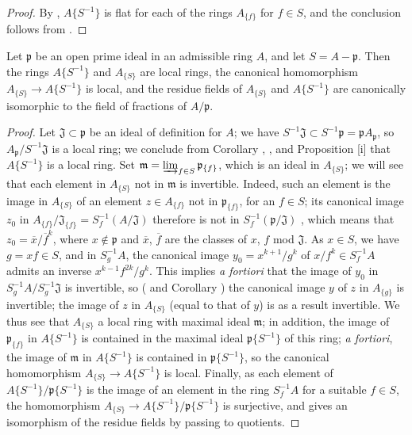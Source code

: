 \begin{proof}
By , $A\{S^{-1}\}$ is flat for each of the rings $A_{\{f\}}$ for
$f\in S$, and the conclusion follows from .
\end{proof}

\begin{proposition}[7.6.17]
\label{0.7.6.17}
Let $\mathfrak{p}$ be an open prime ideal in an admissible ring $A$, and let $S=A-\mathfrak{p}$.
Then the rings $A\{S^{-1}\}$ and $A_{\{S\}}$ are local rings, the canonical homomorphism
$A_{\{S\}}\to A\{S^{-1}\}$ is local, and the residue fields of $A_{\{S\}}$ and $A\{S^{-1}\}$ are
canonically isomorphic to the field of fractions of $A/\mathfrak{p}$.
\end{proposition}

\begin{proof}
Let $\mathfrak{J}\subset\mathfrak{p}$ be an ideal of definition for $A$; we have
$S^{-1}\mathfrak{J}\subset S^{-1}\mathfrak{p}=\mathfrak{p}A_\mathfrak{p}$, so
$A_\mathfrak{p}/S^{-1}\mathfrak{J}$ is a local ring; we conclude from 
Corollary , , and
Proposition [i] that $A\{S^{-1}\}$ is a local ring. Set
$\mathfrak{m}=\varinjlim_{f\in S}\mathfrak{p}_{\{f\}}$, which is an ideal in $A_{\{S\}}$; we
will see that each element in $A_{\{S\}}$ not in $\mathfrak{m}$ is invertible. Indeed, such an
element is the image in $A_{\{S\}}$ of an element $z\in A_{\{f\}}$ not in $\mathfrak{p}_{\{f\}}$,
for an $f\in S$; its canonical image $z_0$ in
$A_{\{f\}}/\mathfrak{J}_{\{f\}}=S_f^{-1}(A/\mathfrak{J})$ therefore is not in
$S_f^{-1}(\mathfrak{p}/\mathfrak{J})$ , which means that
$z_0=\overline{x}/\overline{f}^k$, where $x\not\in\mathfrak{p}$ and $\overline{x}$, $\overline{f}$
are the classes of $x$, $f$ mod $\mathfrak{J}$. As $x\in S$, we have $g=xf\in S$, and in
$S_g^{-1}A$, the canonical image $y_0=x^{k+1}/g^k$ of $x/f^k\in S_f^{-1}A$ admits an inverse
$x^{k-1}f^{2k}/g^k$. This implies \emph{a fortiori} that the image of $y_0$ in
$S_g^{-1}A/S_g^{-1}\mathfrak{J}$ is invertible, so ( and
Corollary ) the canonical image $y$ of $z$ in $A_{\{g\}}$ is
invertible; the image of $z$ in $A_{\{S\}}$ (equal to that of $y$) is as a result invertible.
We thus see that $A_{\{S\}}$ a local ring with maximal ideal $\mathfrak{m}$; in addition, the image
of $\mathfrak{p}_{\{f\}}$ in $A\{S^{-1}\}$ is contained in the maximal ideal $\mathfrak{p}\{S^{-1}\}$
of this ring; \emph{a fortiori}, the image of $\mathfrak{m}$ in $A\{S^{-1}\}$ is contained in
$\mathfrak{p}\{S^{-1}\}$, so the canonical homomorphism $A_{\{S\}}\to A\{S^{-1}\}$ is local. Finally,
as each element of $A\{S^{-1}\}/\mathfrak{p}\{S^{-1}\}$ is the image of an element in the ring
$S_f^{-1}A$ for a suitable $f\in S$, the homomorphism $A_{\{S\}}\to A\{S^{-1}\}/\mathfrak{p}\{S^{-1}\}$
is surjective, and gives an isomorphism of the residue fields by passing to quotients.
\end{proof}

